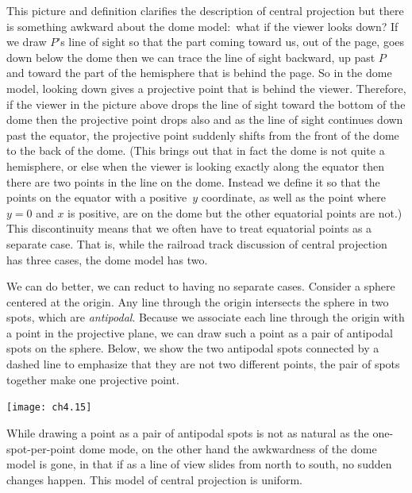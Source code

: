 This picture and definition
clarifies the description of central projection
but there is something awkward about the dome 
model:~what if the viewer looks down?
If we draw $P$'s line of sight so that the part 
coming toward us, out of the page,
goes down below the dome then we can trace
the line of sight backward, up past $P$ and toward the part of the
hemisphere that is behind the page.
So in the dome model, looking down gives a projective point 
that is behind the viewer. 
Therefore, if the viewer in the picture above
drops the line of sight toward the bottom of the
dome then the projective point drops also and as
the line of sight continues down past the equator, the projective point
suddenly shifts from the front of the dome to the back of the dome.
(This brings out that in fact the dome is not quite a hemisphere, or else
when the viewer is looking exactly along the equator then there are 
two points in the line on the dome. 
Instead we define it so that the
points on the equator with a positive~$y$ coordinate, as well as the point
where $y=0$ and $x$ is positive, are on the dome but the other equatorial
points are not.)
This discontinuity means that
we often have to treat equatorial points as a separate case.
That is, while the railroad track discussion of central projection
has three cases,
the dome model has two.

We can do better, we can reduct to having no separate cases.
Consider a sphere centered at the origin.
Any line through the origin intersects the sphere in two spots, which
are \emph{antipodal}.
Because we associate each line through the origin 
with a point in the projective 
plane, we can draw such a point as a pair of antipodal spots on the sphere. 
Below, we show the two antipodal spots connected by a dashed line
to emphasize that they are not two 
different points, the pair of spots together make one projective point.
\begin{center}
  \texttt{[image: ch4.15]}
\end{center}
While drawing a point as a pair of antipodal 
spots is not as natural as the one-spot-per-point dome mode,
on the other hand
the awkwardness of the dome model is gone, in that if 
as a line of view slides from north to south, 
no sudden changes happen.
This model of central projection is uniform.

